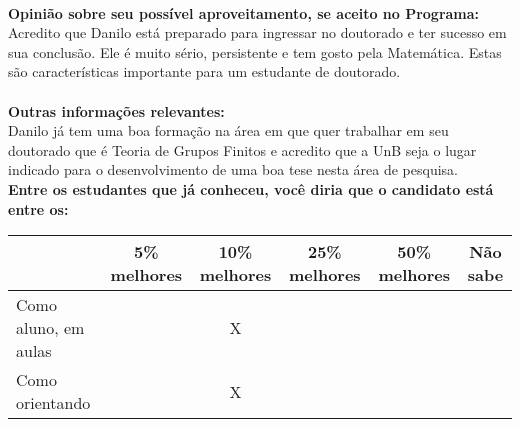 \documentclass[11pt]{article}
\begin{document}
\\
\textbf{Opinião sobre seu possível aproveitamento, se aceito no Programa:}
\\Acredito que Danilo está preparado para ingressar no doutorado e ter sucesso em sua conclusão. Ele é muito sério, persistente e tem gosto pela Matemática. Estas são características importante para um estudante de doutorado.\\ 
\\
\textbf{Outras informações relevantes:} \\Danilo já tem uma boa formação na área em que quer trabalhar em seu doutorado que é Teoria de Grupos Finitos e acredito que a UnB seja o lugar indicado para o desenvolvimento de uma boa tese nesta área de pesquisa.
\\[0.3cm]
\textbf{Entre os estudantes que já conheceu, você diria que o candidato está entre os:}
\\
\begin{tabular}{|l|c|c|c|c|c|}
\hline
 & 5\% melhores & 10\% melhores & 25\% melhores & 50\% melhores & Não sabe \\
\hline
Como aluno, em aulas &  & X &  &  & \\
\hline
Como orientando &  & X &  &  & \\
\hline
\end{tabular}
\end{document}
